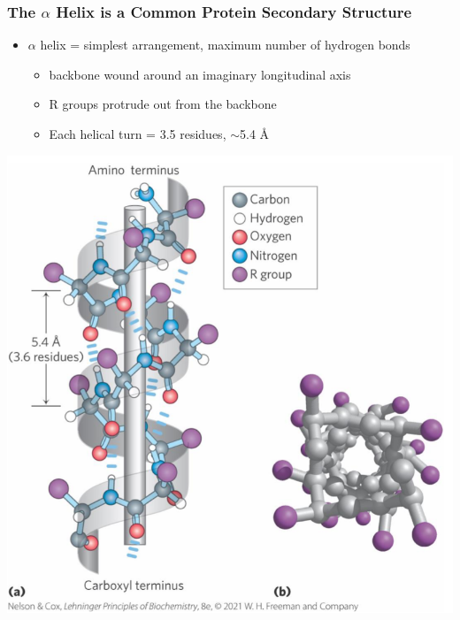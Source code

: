 \documentclass[10pt]{article}
\begin{document}
\subsubsection*{The $\alpha$ Helix is a Common Protein Secondary Structure}
\begin{itemize}
    \item $\alpha$ helix = simplest arrangement, maximum number of hydrogen bonds
    \begin{itemize}
        \item backbone wound around an imaginary longitudinal axis
        \item R groups protrude out from the backbone
        \item Each helical turn = 3.5 residues, $\sim$5.4 \r{A}
    \end{itemize}
\end{itemize}
\begin{center}
    \includegraphics*[scale=0.4]{L2_2.png}
\end{center}
\end{document}

